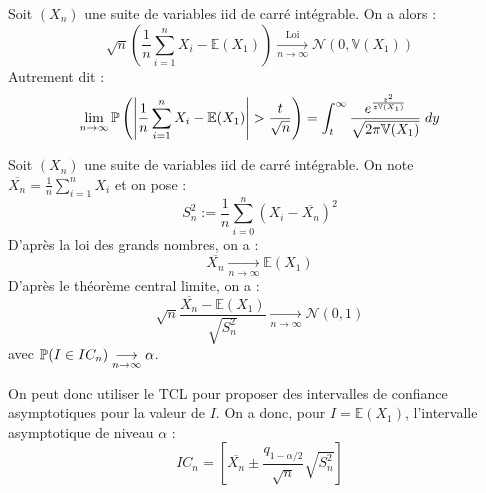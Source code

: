 \begin{theorem}
    Soit $(X_n)$ une suite de variables iid de carré intégrable. On a alors : 
        $$ \boxed{ \sqrt{n} \left( \frac{1}{n} \sum_{i=1}^{n} X_i - \mathbb{E}(X_1) \right) \underset{n \to \infty}{\overset{\text{Loi}}{\longrightarrow}} \mathcal{N}(0, \mathbb{V}(X_1) ) } $$   
    Autrement dit : 
        $$ \lim_{n \to \infty} \mathbb{P} \left( \left| \frac{1}{n} \sum_{i=1}^{n} X_i - \mathbb{E}(X_1) \right| > \frac{t}{\sqrt{n}} \right) 
        = \int_{t}^{\infty} \frac{e^{\frac{z^2}{z \mathbb{V}(X_1) }}}{\sqrt{2 \pi \mathbb{V}(X_1) }} \; dy $$ 
\end{theorem}

\begin{rappel}
    Soit $(X_n)$ une suite de variables iid de carré intégrable. On note $\overline{X_n} = \frac{1}{n} \sum_{i=1}^{n} X_i $ et on pose : 
        $$ S^2_n := \frac{1}{n} \sum_{i=0}^{n} (X_i - \overline{X_n})^2 $$ 
    D'après la loi des grands nombres, on a : 
        $$ \overline{X_n} \underset{n \to \infty}{\longrightarrow} \mathbb{E}( X_1) $$ 
    D'après le théorème central limite, on a :  
        $$ \sqrt{n} \frac{\overline{X_n} - \mathbb{E}(X_1) }{\sqrt{S^2_n}} \underset{n \to \infty}{\longrightarrow} \mathcal{N}(0,1) $$ 
    avec $ \mathbb{P}(I \in IC_n) \underset{n \to \infty}{\longrightarrow} \alpha $.  
\end{rappel}

\begin{proposition}
    On peut donc utiliser le TCL pour proposer des intervalles de confiance asymptotiques pour la valeur de $I$. 
    On a donc, pour $ I = \mathbb{E}(X_1)$, l'intervalle asymptotique de niveau $ \alpha$ : 
        $$ \boxed{IC_n = \left[ \overline{X_n} \pm \frac{q_{1 - \alpha/2}}{\sqrt{n}} \sqrt{S_n^2} \right]} $$
\end{proposition}

